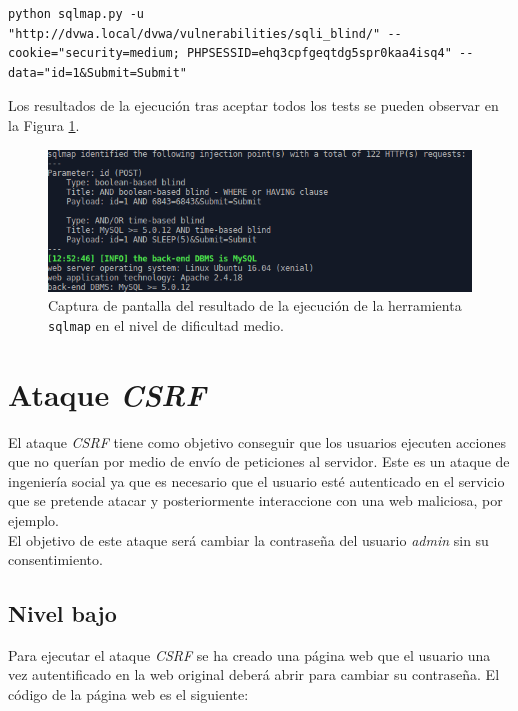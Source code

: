\documentclass{article}
\begin{document}
\begin{lstlisting}
python sqlmap.py -u "http://dvwa.local/dvwa/vulnerabilities/sqli_blind/" --cookie="security=medium; PHPSESSID=ehq3cpfgeqtdg5spr0kaa4isq4" --data="id=1&Submit=Submit"
\end{lstlisting}

Los resultados de la ejecución tras aceptar todos los tests se pueden observar en la Figura \ref{fig:sql_injection_blind_medium}.\\

\begin{figure}[h!]
    \centering
    \includegraphics[scale=0.8]{images/sql_injection_blind_medium.png}
    \caption{Captura de pantalla del resultado de la ejecución de la herramienta \texttt{sqlmap} en el nivel de dificultad medio.}
    \label{fig:sql_injection_blind_medium}
\end{figure}


\section{Ataque \textit{CSRF}}

El ataque \textit{CSRF} tiene como objetivo conseguir que los usuarios ejecuten acciones que no querían por medio de envío de peticiones al servidor. Este es un ataque de ingeniería social ya que es necesario que el usuario esté autenticado en el servicio que se pretende atacar y posteriormente interaccione con una web maliciosa, por ejemplo.\\
El objetivo de este ataque será cambiar la contraseña del usuario \textit{admin} sin su consentimiento.\\

\subsection{Nivel bajo}

Para ejecutar el ataque \textit{CSRF} se ha creado una página web que el usuario una vez autentificado en la web original deberá abrir para cambiar su contraseña. El código de la página web es el siguiente:
\end{document}
